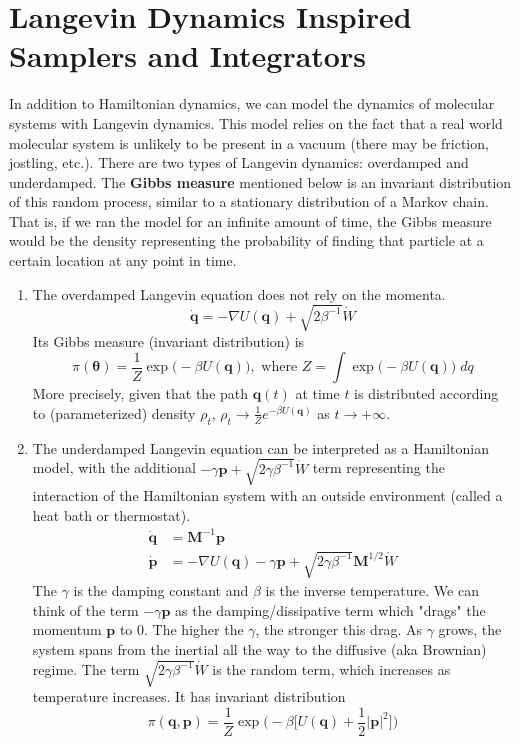 \section{Langevin Dynamics Inspired Samplers and Integrators}

    In addition to Hamiltonian dynamics, we can model the dynamics of molecular systems with Langevin dynamics. This model relies on the fact that a real world molecular system is unlikely to be present in a vacuum (there may be friction, jostling, etc.). There are two types of Langevin dynamics: overdamped and underdamped. The \textbf{Gibbs measure} mentioned below is an invariant distribution of this random process, similar to a stationary distribution of a Markov chain. That is, if we ran the model for an infinite amount of time, the Gibbs measure would be the density representing the probability of finding that particle at a certain location at any point in time. 
    \begin{enumerate}
      \item The overdamped Langevin equation does not rely on the momenta. 
      \begin{equation}
        \mathbf{\dot{q}} = - \nabla U(\mathbf{q}) + \sqrt{2 \beta^{-1}} \dot{W}
      \end{equation}
      Its Gibbs measure (invariant distribution) is 
      \begin{equation}
        \pi(\boldsymbol{\theta}) = \frac{1}{Z} \exp\big( - \beta U(\mathbf{q})\big), \text{ where } Z = \int \exp\big( - \beta U(\mathbf{q})\big)\; dq
      \end{equation}
      More precisely, given that the path $\mathbf{q}(t)$ at time $t$ is distributed according to (parameterized) density $\rho_t$, $\rho_t \rightarrow \frac{1}{Z} e^{-\beta U(\mathbf{q})}$ as $t \rightarrow +\infty$. 
      \item The underdamped Langevin equation can be interpreted as a Hamiltonian model, with the additional $- \gamma \mathbf{p} + \sqrt{2\gamma \beta^{-1}} \dot{W}$ term representing the interaction of the Hamiltonian system with an outside environment (called a heat bath or thermostat). 
      \begin{align*}
        \mathbf{\dot{q}} & = \mathbf{M}^{-1} \mathbf{p} \\
        \mathbf{\dot{p}} & = - \nabla U(\mathbf{q}) - \gamma \mathbf{p} + \sqrt{2\gamma \beta^{-1}} \mathbf{M}^{1/2} \dot{W}
      \end{align*}
      The $\gamma$ is the damping constant and $\beta$ is the inverse temperature. We can think of the term $-\gamma \mathbf{p}$ as the damping/dissipative term which "drags" the momentum $\mathbf{p}$ to $0$. The higher the $\gamma$, the stronger this drag. As $\gamma$ grows, the system spans from the inertial all the way to the diffusive (aka Brownian) regime. The term $\sqrt{2 \gamma \beta^{-1}} \dot{W}$ is the random term, which increases as temperature increases. It has invariant distribution 
      \begin{equation}
        \pi(\boldsymbol{q}, \boldsymbol{p}) = \frac{1}{Z} \exp\big( -\beta \big[ U(\mathbf{q}) + \frac{1}{2} |\mathbf{p}|^2\big] \big)
      \end{equation}
    \end{enumerate}
